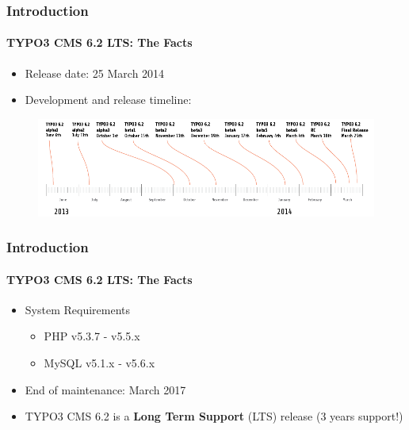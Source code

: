 \begin{frame}[fragile]
	\frametitle{Introduction}
	\framesubtitle{TYPO3 CMS 6.2 LTS: The Facts}

	\begin{itemize}
		\item Release date: 25 March 2014
		\item Development and release timeline:
	\end{itemize}

	\begin{figure}
		\includegraphics[width=0.99\linewidth]{Images/Introduction/ReleaseTimeline.png}
	\end{figure}

\end{frame}


\begin{frame}[fragile]
	\frametitle{Introduction}
	\framesubtitle{TYPO3 CMS 6.2 LTS: The Facts}

	\begin{itemize}
		\item System Requirements
		\begin{itemize}
			\item PHP	\tabto{1.2cm} v5.3.7 - v5.5.x
			\item MySQL	\tabto{1.2cm} v5.1.x - v5.6.x
		\end{itemize}
	\end{itemize}

	\begin{itemize}
		\item End of maintenance: March 2017
		\item TYPO3 CMS 6.2 is a \textbf{Long Term Support} (LTS) release (3 years support!)
	\end{itemize}

\end{frame}


